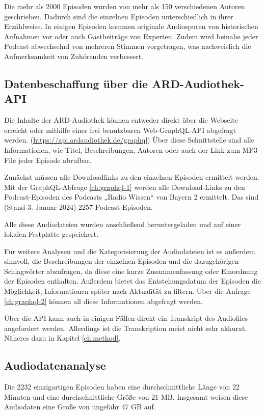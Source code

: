 Die mehr als 2000 Episoden wurden von mehr als 150 verschiedenen Autoren geschrieben.
Dadurch sind die einzelnen Episoden unterschiedlich in ihrer Erzählweise.
In einigen Episoden kommen originale Audiospuren von historischen Aufnahmen vor oder auch Gastbeiträge von Experten.
Zudem wird beinahe jeder Podcast abwechselnd von mehreren Stimmen vorgetragen, was nachweislich die Aufmerksamkeit von Zuhörenden verbessert.

\subsection{Datenbeschaffung über die ARD-Audiothek-API}

Die Inhalte der ARD-Audiothek können entweder direkt über die Webseite erreicht oder mithilfe einer frei benutzbaren Web-GraphQL-API abgefragt werden.
(\url{https://api.ardaudiothek.de/graphql}) 
Über diese Schnittstelle sind alle Informationen, wie Titel, Beschreibungen, Autoren oder auch der Link zum MP3-File jeder Episode abrufbar.

Zunächst müssen alle Downloadlinks zu den einzelnen Episoden ermittelt werden.
Mit der GraphQL-Abfrage \autoref{ch:graphql-1} werden alle Download-Links zu den Podcast-Episoden des Podcasts „Radio Wissen“ von Bayern 2 ermittelt.
Das sind (Stand 3. Januar 2024) 2257 Podcast-Episoden.

Alle diese Audiodateien wurden anschließend heruntergeladen und auf einer lokalen Festplatte gespeichert.

Für weitere Analysen und die Kategorisierung der Audiodateien ist es außerdem sinnvoll, die Beschreibungen der einzelnen Episoden und die dazugehörigen Schlagwörter abzufragen, da diese eine kurze Zusammenfassung oder Einordnung der Episoden enthalten.
Außerdem bietet das Entstehungsdatum der Episoden die Möglichkeit, Informationen später nach Aktualität zu filtern.
Über die Anfrage \autoref{ch:graphql-2} können all diese Informationen abgefragt werden.

Über die API kann auch in einigen Fällen direkt ein Transkript des Audiofiles angefordert werden.
Allerdings ist die Transkription meist nicht sehr akkurat.
Näheres dazu in Kapitel \autoref{ch:method}.

\subsection{Audiodatenanalyse}

Die 2232 einzigartigen Episoden haben eine durchschnittliche Länge von 22 Minuten und eine durchschnittliche Größe von 21 MB.
Insgesamt weisen diese Audiodaten eine Größe von ungefähr 47 GB auf.

